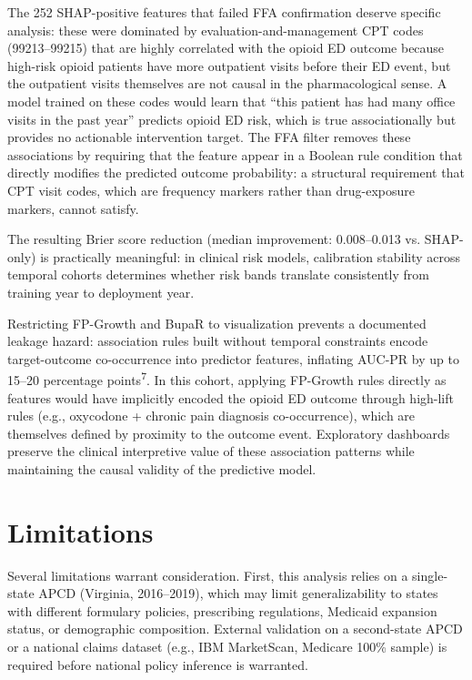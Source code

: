 \documentclass[
  12pt,
]{book}
\begin{document}
The 252 SHAP-positive features that failed FFA confirmation deserve
specific analysis: these were dominated by evaluation-and-management CPT
codes (99213--99215) that are highly correlated with the opioid ED
outcome because high-risk opioid patients have more outpatient visits
before their ED event, but the outpatient visits themselves are not
causal in the pharmacological sense. A model trained on these codes
would learn that ``this patient has had many office visits in the past
year'' predicts opioid ED risk, which is true associationally but
provides no actionable intervention target. The FFA filter removes these
associations by requiring that the feature appear in a Boolean rule
condition that directly modifies the predicted outcome probability: a
structural requirement that CPT visit codes, which are frequency markers
rather than drug-exposure markers, cannot satisfy.

The resulting Brier score reduction (median improvement: 0.008--0.013
vs. SHAP-only) is practically meaningful: in clinical risk models,
calibration stability across temporal cohorts determines whether risk
bands translate consistently from training year to deployment year.

Restricting FP-Growth and BupaR to visualization prevents a documented
leakage hazard: association rules built without temporal constraints
encode target-outcome co-occurrence into predictor features, inflating
AUC-PR by up to 15--20 percentage points\textsuperscript{7}. In this
cohort, applying FP-Growth rules directly as features would have
implicitly encoded the opioid ED outcome through high-lift rules (e.g.,
oxycodone + chronic pain diagnosis co-occurrence), which are themselves
defined by proximity to the outcome event. Exploratory dashboards
preserve the clinical interpretive value of these association patterns
while maintaining the causal validity of the predictive model.

\section{Limitations}\label{limitations}

Several limitations warrant consideration. First, this analysis relies
on a single-state APCD (Virginia, 2016--2019), which may limit
generalizability to states with different formulary policies,
prescribing regulations, Medicaid expansion status, or demographic
composition. External validation on a second-state APCD or a national
claims dataset (e.g., IBM MarketScan, Medicare 100\% sample) is required
before national policy inference is warranted.
\end{document}
